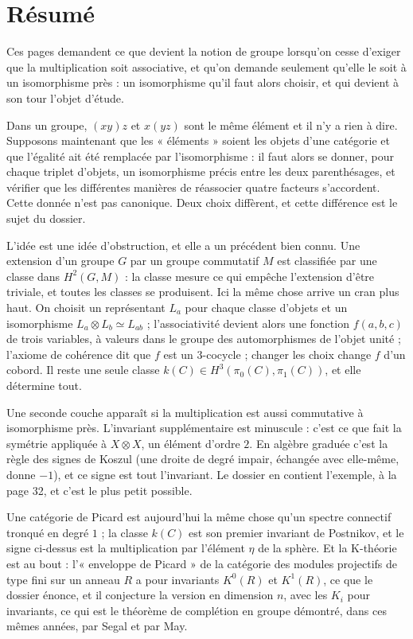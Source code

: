 \documentclass[11pt,a4paper]{article}
\begin{document}
\section*{Résumé}

\begin{resume}
Ces pages demandent ce que devient la notion de groupe lorsqu'on cesse
d'exiger que la multiplication soit associative, et qu'on demande seulement
qu'elle le soit à un isomorphisme près : un isomorphisme qu'il faut alors
choisir, et qui devient à son tour l'objet d'étude.

Dans un groupe, $(xy)z$ et $x(yz)$ sont le même élément et il n'y a rien à
dire. Supposons maintenant que les « éléments » soient les objets d'une
catégorie et que l'égalité ait été remplacée par l'isomorphisme : il faut
alors se donner, pour chaque triplet d'objets, un isomorphisme précis entre
les deux parenthésages, et vérifier que les différentes manières de
réassocier quatre facteurs s'accordent. Cette donnée n'est pas canonique.
Deux choix diffèrent, et cette différence est le sujet du dossier.

L'idée est une idée d'obstruction, et elle a un précédent bien
connu. Une extension d'un groupe $G$ par un groupe commutatif $M$ est
classifiée par une classe dans $H^{2}(G,M)$ : la classe mesure ce qui empêche
l'extension d'être triviale, et toutes les classes se produisent. Ici la même
chose arrive un cran plus haut. On choisit un représentant $L_{a}$ pour chaque
classe d'objets et un isomorphisme $L_{a} \otimes L_{b} \simeq L_{ab}$ ;
l'associativité devient alors une fonction $f(a,b,c)$ de trois variables, à
valeurs dans le groupe des automorphismes de l'objet unité ; l'axiome de cohérence dit que $f$ est un $3$-cocycle ; changer les choix change
$f$ d'un cobord. Il reste une seule classe
$k(C) \in H^{3}(\pi_{0}(C), \pi_{1}(C))$, et elle détermine tout.

Une seconde couche apparaît si la multiplication est aussi commutative à
isomorphisme près. L'invariant supplémentaire est minuscule : c'est ce que
fait la symétrie appliquée à $X \otimes X$, un élément d'ordre $2$. En algèbre
graduée c'est la règle des signes de Koszul (une droite de degré impair, échangée avec
elle-même, donne $-1$), et ce signe est tout l'invariant.
Le dossier en contient l'exemple, à la page 32, et c'est le plus petit
possible.

Une catégorie de Picard est aujourd'hui la même chose
qu'un spectre connectif tronqué en degré $1$ ; la classe $k(C)$ est son
premier invariant de Postnikov, et le signe ci-dessus est la multiplication
par l'élément $\eta$ de la sphère. Et la K-théorie est au bout : l'« enveloppe
de Picard » de la catégorie des modules projectifs de type fini sur un anneau
$R$ a pour invariants $K^{0}(R)$ et $K^{1}(R)$, ce que le dossier énonce, et
il conjecture la version en dimension $n$, avec les $K_{i}$ pour invariants,
ce qui est le théorème de complétion en groupe démontré, dans ces mêmes
années, par Segal et par May.


\end{resume}
\end{document}
